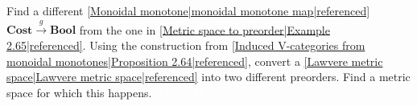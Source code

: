 
Find a different \ref{Monoidal monotone|monoidal monotone map|referenced} $\mathbf{Cost}\xrightarrow{g}\mathbf{Bool}$ from the one in \ref{Metric space to preorder|Example 2.65|referenced}.  Using the construction from \ref{Induced V-categories from monoidal monotones|Proposition 2.64|referenced}, convert a \ref{Lawvere metric space|Lawvere metric space|referenced} into two different preorders. Find a metric space for which this happens.\textcolor{white}{NOCARD}